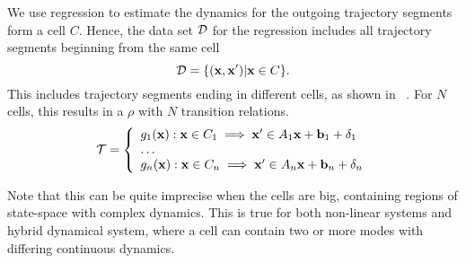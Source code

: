 We use regression to estimate the dynamics for the outgoing trajectory
segments form a cell $C$. Hence, the data set $\mathcal{D}$ for the regression
includes all trajectory segments beginning from the same cell
\[
    \mathcal{D} = \{(\mathbf{x},\mathbf{x}') | \mathbf{x} \in C\}.
\]
This includes trajectory segments ending in different cells, as shown
in ~. For $N$ cells, this results in a $\rho$ with $N$ transition relations.
\begin{equation*}
    \mathcal{T} = \left\{
        \begin{array}{ll}
            g_1(\mathbf{x}):\mathbf{x} \in C_1 \implies \mathbf{x}' \in A_1\mathbf{x} + \mathbf{b}_1 + \delta_1\\
            \ldots \\
            g_n(\mathbf{x}):\mathbf{x} \in C_n \implies \mathbf{x}' \in A_n\mathbf{x} + \mathbf{b}_n + \delta_n\\
        \end{array}
    \right.
\end{equation*}

Note that this can be quite imprecise when the cells are big,
containing regions of state-space with complex dynamics. This is true
for both non-linear systems and hybrid dynamical system, where a cell
can contain two or more modes with differing continuous dynamics.


